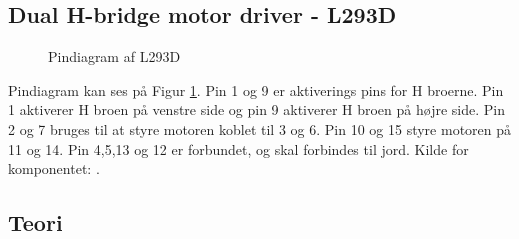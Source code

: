 \subsection{Dual H-bridge motor driver - L293D}
\begin{figure}[H] \label{fig:pindiagramL293D}
	\centering 
	\caption{Pindiagram af L293D}
\end{figure}
Pindiagram kan ses på Figur \ref{fig:pindiagramL293D}. Pin 1 og 9 er aktiverings pins for H broerne. Pin 1 aktiverer H broen på venstre side og pin 9 aktiverer H broen på højre side. Pin 2 og 7 bruges til at styre motoren koblet til 3 og 6. Pin 10 og 15 styre motoren på 11 og 14. Pin 4,5,13 og 12 er forbundet, og skal forbindes til jord. Kilde for komponentet: \cite{komphbridge}.
\subsection{Teori}
